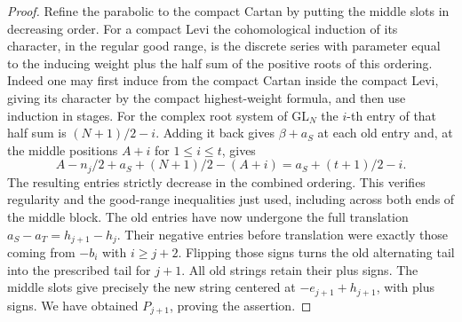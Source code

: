 \documentclass[a4paper,11pt]{article}
\theoremstyle{definition}
\theoremstyle{remark}
\numberwithin{equation}{section}
\begin{document}
\begin{proof}
Refine the parabolic to the compact Cartan by putting the
middle slots in decreasing order. For a compact Levi the
cohomological induction of its character, in the regular
good range, is the discrete series with parameter equal to
the inducing weight plus the half sum of the positive roots
of this ordering. Indeed one may first induce from the
compact Cartan inside the compact Levi, giving its character
by the compact highest-weight formula, and then use induction
in stages. For the complex root system of \(\mathrm{GL}_N\) the \(i\)-th
entry of that half sum is \((N+1)/2-i\). Adding it back gives
\(\beta+a_S\) at each old entry and, at the middle positions
\(A+i\) for \(1\le i\le t\), gives
\[
     A-n_j/2+a_S+(N+1)/2-(A+i)
                     =a_S+(t+1)/2-i .
\]
The resulting entries strictly decrease in the combined
ordering. This verifies regularity and the good-range
inequalities just used, including across both ends of the
middle block. The old entries have now undergone the full
translation \(a_S-a_T=h_{j+1}-h_j\). Their negative
entries before translation were exactly those coming from
\(-b_i\) with \(i\ge j+2\). Flipping those signs turns the
old alternating tail into the prescribed tail for \(j+1\).
All old strings retain their plus signs. The middle slots
give precisely the new string centered at
\(-e_{j+1}+h_{j+1}\), with plus signs. We have obtained
\(P_{j+1}\), proving the assertion.
\end{proof}
\end{document}
